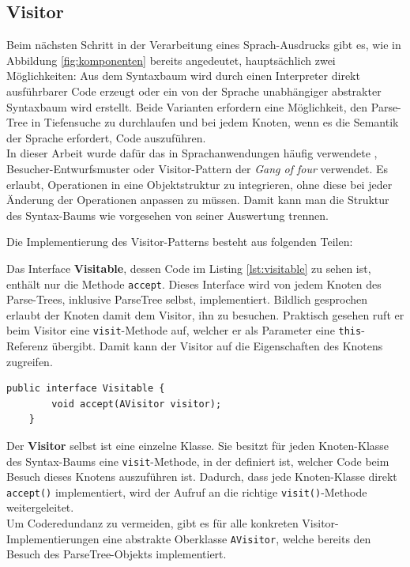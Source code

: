 \subsection{Visitor}\label{ssct:4.3.5:visitor}
Beim nächsten Schritt in der Verarbeitung eines Sprach-Ausdrucks gibt es, wie in Abbildung \ref{fig:komponenten} bereits angedeutet, hauptsächlich zwei Möglichkeiten: Aus dem Syntaxbaum wird durch einen Interpreter direkt ausführbarer Code erzeugt oder ein von der Sprache unabhängiger abstrakter Syntaxbaum wird erstellt. Beide Varianten erfordern eine Möglichkeit, den Parse-Tree in Tiefensuche zu durchlaufen und bei jedem Knoten, wenn es die Semantik der Sprache erfordert, Code auszuführen.\\
In dieser Arbeit wurde dafür das in Sprachanwendungen häufig verwendete \cite{book:parrLang}, \cite{www:wiki:visitor} Besucher-Entwurfsmuster oder Visitor-Pattern der \emph{Gang of four} \cite{book:designPatterns} verwendet. Es erlaubt, Operationen in eine Objektstruktur zu integrieren, ohne diese bei jeder Änderung der Operationen anpassen zu müssen. Damit kann man die Struktur des Syntax-Baums wie vorgesehen von seiner Auswertung trennen.

Die Implementierung des Visitor-Patterns besteht aus folgenden Teilen:

Das Interface \textbf{Visitable}, dessen Code im Listing \ref{lst:visitable} zu sehen ist, enthält nur die Methode \texttt{accept}. Dieses Interface wird von jedem Knoten des Parse-Trees, inklusive ParseTree selbst, implementiert. Bildlich gesprochen erlaubt der Knoten damit dem Visitor, ihn zu besuchen. Praktisch gesehen ruft er beim Visitor eine \texttt{visit}-Methode auf, welcher er als Parameter eine \texttt{this}-Referenz übergibt. Damit kann der Visitor auf die Eigenschaften des Knotens zugreifen.\\

\begin{lstlisting}[caption={Code des Visitable-Interfaces},label=lst:visitable]
	public interface Visitable {
		void accept(AVisitor visitor);
	}
\end{lstlisting}

Der \textbf{Visitor} selbst ist eine einzelne Klasse. Sie besitzt für jeden Knoten-Klasse des Syntax-Baums eine \texttt{visit}-Methode, in der definiert ist, welcher Code beim Besuch dieses Knotens auszuführen ist. Dadurch, dass jede Knoten-Klasse direkt \texttt{accept()} implementiert, wird der Aufruf an die richtige \texttt{visit()}-Methode weitergeleitet.\\
Um Coderedundanz zu vermeiden, gibt es für alle konkreten Visitor-Implementierungen eine abstrakte Oberklasse \texttt{AVisitor}, welche bereits den Besuch des ParseTree-Objekts implementiert.\\

